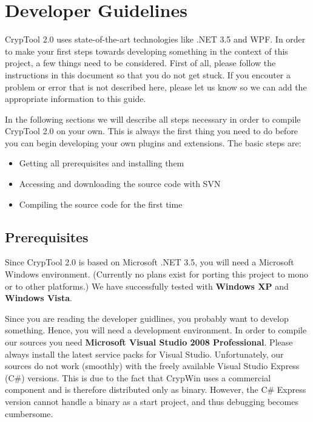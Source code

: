 \chapter{Developer Guidelines}
\label{DeveloperGuidelines}

CrypTool 2.0 uses state-of-the-art technologies like .NET 3.5 and WPF. In order to make your first steps towards developing something in the context of this project, a few things need to be considered. First of all, please follow the instructions in this document so that you do not get stuck. If you encouter a problem or error that is not described here, please let us know so we can add the appropriate information to this guide.

In the following sections we will describe all steps necessary in order to compile CrypTool 2.0 on your own. This is always the first thing you need to do before you can begin developing your own plugins and extensions. The basic steps are:
\begin{itemize}
	\item Getting all prerequisites and installing them
	\item Accessing and downloading the source code with SVN
	\item Compiling the source code for the first time
\end{itemize}

\section{Prerequisites}
\label{Prerequisites}

Since CrypTool 2.0 is based on Microsoft .NET 3.5, you will need a Microsoft Windows environment. (Currently no plans exist for porting this project to mono or to other platforms.) We have successfully tested with \textbf{Windows XP} and \textbf{Windows Vista}.

Since you are reading the developer guidlines, you probably want to develop something. Hence, you will need a development environment. In order to compile our sources you need \textbf{Microsoft Visual Studio 2008 Professional}. Please always install the latest service packs for Visual Studio. Unfortunately, our sources do not work (smoothly) with the freely available Visual Studio Express (C\#) versions. This is due to the fact that CrypWin uses a commercial component and is therefore distributed only as binary. However, the C\# Express version cannot handle a binary as a start project, and thus debugging becomes cumbersome.

